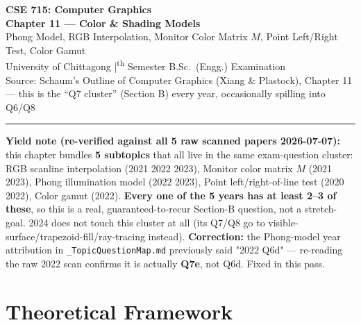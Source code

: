 \documentclass[12pt, a4paper]{article}
\newenvironment{notesbox}{\begin{mdframed}[style=notesframe]}{\end{mdframed}}
\begin{document}
\begin{center}
  {\LARGE\bfseries\color{sectionblue} CSE 715: Computer Graphics}\\[0.6em]
  {\Large\bfseries Chapter 11 --- Color \& Shading Models}\\[0.3em]
  {\large Phong Model, RGB Interpolation, Monitor Color Matrix $M$, Point Left/Right Test, Color Gamut}\\[0.2em]
  {\normalsize University of Chittagong \quad|\textsuperscript{th} Semester B.Sc.\ (Engg.) Examination}\\[0.3em]
  {\small Source: Schaum's Outline of Computer Graphics (Xiang \& Plastock), Chapter 11 --- this is the ``Q7 cluster'' (Section B) every year, occasionally spilling into Q6/Q8}
\end{center}

\vspace{0.3em}\noindent\rule{\linewidth}{1pt}\vspace{0.5em}

\begin{notesbox}
\textbf{Yield note (re-verified against all 5 raw scanned papers 2026-07-07):} this chapter bundles \textbf{5 subtopics} that all live in the same exam-question cluster: RGB scanline interpolation (2021 2022 2023), Monitor color matrix $M$ (2021 2023), Phong illumination model (2022 2023), Point left/right-of-line test (2020 2022), Color gamut (2022). \textbf{Every one of the 5 years has at least 2--3 of these}, so this is a real, guaranteed-to-recur Section-B question, not a stretch-goal. 2024 does not touch this cluster at all (its Q7/Q8 go to visible-surface/trapezoid-fill/ray-tracing instead). \textbf{Correction:} the Phong-model year attribution in \texttt{\_TopicQuestionMap.md} previously said "2022 Q6d" --- re-reading the raw 2022 scan confirms it is actually \textbf{Q7e}, not Q6d. Fixed in this pass.
\end{notesbox}

\tableofcontents
\newpage

\section{Theoretical Framework}
\end{document}
